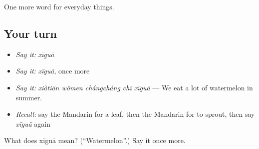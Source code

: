 \begin{grammarlens}[title={What you've built}]
One more word for everyday things.
\end{grammarlens}

\subsection*{Your turn}
\begin{itemize}
\raggedright
  \item \emph{Say it:} \emph{xīguā}
  \item \emph{Say it:} \emph{xīguā}, once more
  \item \emph{Say it:} \emph{xiàtiān wǒmen chángcháng chī xīguā} — We eat a lot of watermelon in summer.
  \item \emph{Recall:} say the Mandarin for a leaf, then the Mandarin for to sprout, then say \emph{xīguā} again
\end{itemize}

\begin{tcolorbox}[breakable,colback=teal!4,colframe=teal!35!black,title={Before you move on}]
What does xīguā mean? (\textquotedblleft{}Watermelon\textquotedblright{}.) Say it once more.
\end{tcolorbox}
